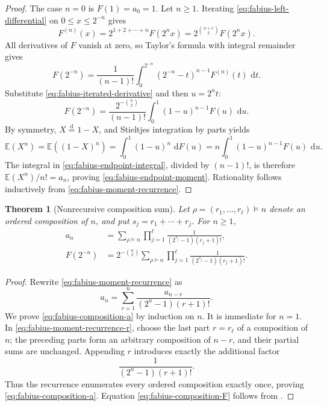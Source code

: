 \documentclass[11pt,oneside,openany]{book}
\newtheorem{theorem}{Theorem}[chapter]
\theoremstyle{definition}
\theoremstyle{remark}
\newcommand{\dd}{\,\mathrm d}
\newcommand{\E}{\mathbb E}
\begin{document}
\begin{proof}
The case $n=0$ is $F(1)=a_0=1$.  Let $n\ge1$.  Iterating \eqref{eq:fabius-left-differential} on $0\le x\le2^{-n}$ gives
\begin{equation}
 F^{(n)}(x)=2^{1+2+\cdots+n}F(2^nx)
 =2^{\binom{n+1}{2}}F(2^nx).\label{eq:fabius-iterated-derivative}
\end{equation}
All derivatives of $F$ vanish at zero, so Taylor's formula with integral remainder gives
\[
 F(2^{-n})
 =\frac1{(n-1)!}\int_0^{2^{-n}}(2^{-n}-t)^{n-1}F^{(n)}(t)\,\dd t.
\]
Substitute \eqref{eq:fabius-iterated-derivative} and then $u=2^nt$:
\begin{equation}
 F(2^{-n})
 =\frac{2^{-\binom n2}}{(n-1)!}
 \int_0^1(1-u)^{n-1}F(u)\,\dd u.\label{eq:fabius-endpoint-integral}
\end{equation}
By symmetry, $X\overset{\mathrm d}{=}1-X$, and Stieltjes integration by parts yields
\[
 \E(X^n)=\E((1-X)^n)
 =\int_0^1(1-u)^n\,\dd F(u)
 =n\int_0^1(1-u)^{n-1}F(u)\,\dd u.
\]
The integral in \eqref{eq:fabius-endpoint-integral}, divided by $(n-1)!$, is therefore $\E(X^n)/n!=a_n$, proving \eqref{eq:fabius-endpoint-moment}.  Rationality follows inductively from \eqref{eq:fabius-moment-recurrence}.
\end{proof}

\begin{theorem}[Nonrecursive composition sum]\label{thm:fabius-composition-sum}
Let $\rho=(r_1,\ldots,r_\ell)\vDash n$ denote an ordered composition of $n$, and put $s_j=r_1+\cdots+r_j$.  For $n\ge1$,
\begin{align}
 a_n&=\sum_{\rho\vDash n}
 \prod_{j=1}^{\ell}
 \frac1{(2^{s_j}-1)(r_j+1)!},\label{eq:fabius-composition-a}\\
 F(2^{-n})&=2^{-\binom n2}
 \sum_{\rho\vDash n}
 \prod_{j=1}^{\ell}
 \frac1{(2^{s_j}-1)(r_j+1)!}.\label{eq:fabius-composition-F}
\end{align}
\end{theorem}

\begin{proof}
Rewrite \eqref{eq:fabius-moment-recurrence} as
\begin{equation}
 a_n=\sum_{r=1}^{n}\frac{a_{n-r}}{(2^n-1)(r+1)!}.\label{eq:fabius-moment-recurrence-r}
\end{equation}
We prove \eqref{eq:fabius-composition-a} by induction on $n$.  It is immediate for $n=1$.  In \eqref{eq:fabius-moment-recurrence-r}, choose the last part $r=r_\ell$ of a composition of $n$; the preceding parts form an arbitrary composition of $n-r$, and their partial sums are unchanged.  Appending $r$ introduces exactly the additional factor
\[
 \frac1{(2^n-1)(r+1)!}.
\]
Thus the recurrence enumerates every ordered composition exactly once, proving \eqref{eq:fabius-composition-a}.  Equation \eqref{eq:fabius-composition-F} follows from .
\end{proof}
\end{document}
